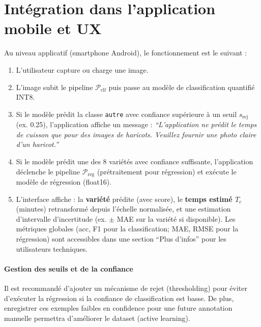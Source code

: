 \section{Intégration dans l'application mobile et UX}

Au niveau applicatif (smartphone Android), le fonctionnement est le suivant :

\begin{enumerate}
	\item L'utilisateur capture ou charge une image.
	\item L'image subit le pipeline \(\mathcal{P}_{\text{clf}}\) puis passe au modèle de classification quantifié INT8.
	\item Si le modèle prédit la classe \texttt{autre} avec confiance supérieure à un seuil \(s_{\text{rej}}\) (ex. 0.25), l'application affiche un message : \emph{``L'application ne prédit le temps de cuisson que pour des images de haricots. Veuillez fournir une photo claire d'un haricot.''}
	\item Si le modèle prédit une des 8 variétés avec confiance suffisante, l'application déclenche le pipeline \(\mathcal{P}_{\text{reg}}\) (prétraitement pour régression) et exécute le modèle de régression (float16).
	\item L'interface affiche : la \textbf{variété} prédite (avec score), le \textbf{temps estimé $T_c$} (minutes) retransformé depuis l'échelle normalisée, et une estimation d'intervalle d'incertitude (ex. $\pm$ MAE sur la variété si disponible). Les métriques globales (acc, F1 pour la classification; MAE, RMSE pour la régression) sont accessibles dans une section ``Plus d'infos'' pour les utilisateurs techniques.
\end{enumerate}

\paragraph{Gestion des seuils et de la confiance}
Il est recommandé d'ajouter un mécanisme de rejet (thresholding) pour éviter d'exécuter la régression si la confiance de classification est basse. De plus, enregistrer ces exemples faibles en confidence pour une future annotation manuelle permettra d'améliorer le dataset (active learning).


